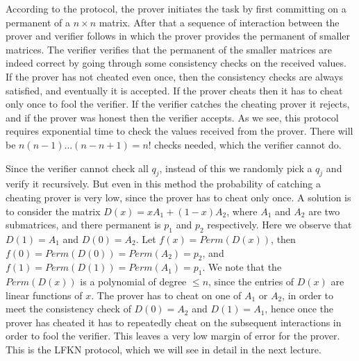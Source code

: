 \documentclass[11pt]{article}
\begin{document}
According to the protocol, the prover initiates the task by first committing on a permanent of a $n
\times n$ matrix. After that a sequence of interaction between the prover and verifier follows in
which the prover provides the permanent of smaller matrices. The verifier verifies that the
permanent of the smaller matrices are indeed correct by going through some consistency checks on the
received values. If the prover has not cheated even once, then the consistency checks are always
satisfied, and eventually it is accepted. If the prover cheats then it has to cheat only once to
fool the verifier. If the verifier catches the cheating prover it rejects, and if the prover was
honest then the verifier accepts. As we see, this protocol requires exponential time to check the
values received from the prover. There will be $n(n-1)...(n - n + 1) = n!$ checks needed, which the
verifier cannot do. 

Since the verifier cannot check all $q_j$, instead of this we randomly pick a $q_j$ and verify it
recursively. But even in this method the probability of catching a cheating prover is very low,
since the prover has to cheat only once. A solution is to consider the matrix $D(x) = xA_1 + (1 -
x)A_2$, where $A_1$ and $A_2$ are two submatrices, and there permanent is $p_1$ and $p_2$
respectively. Here we observe that $D(1) = A_1$ and $D(0) = A_2$. Let $f(x) = Perm(D(x))$, then
$f(0) = Perm(D(0)) = Perm(A_2) = p_2$, and $f(1) = Perm(D(1)) = Perm(A_1) = p_1$. We note that the
$Perm(D(x))$ is a polynomial of degree $\leq n$, since the entries of $D(x)$ are linear functions
of $x$. The prover has to cheat on one of $A_1$ or $A_2$, in order to meet the consistency check of
$D(0) = A_2$ and $D(1) = A_1$, hence once the prover has cheated it has to repeatedly cheat on the
subsequent interactions in order to fool the verifier. This leaves a very low margin of error for
the prover. This is the LFKN protocol, which we will see in detail in the next lecture.
\end{document}
